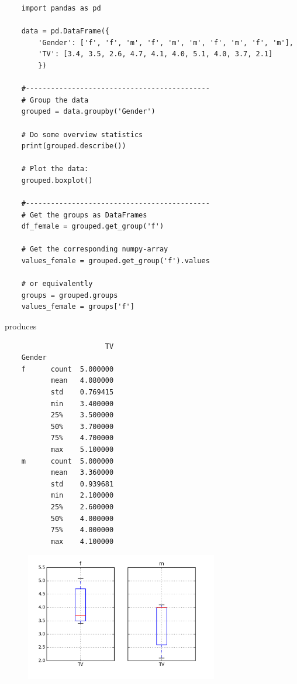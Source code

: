 \begin{lstlisting}
    import pandas as pd

    data = pd.DataFrame({
        'Gender': ['f', 'f', 'm', 'f', 'm', 'm', 'f', 'm', 'f', 'm'],
        'TV': [3.4, 3.5, 2.6, 4.7, 4.1, 4.0, 5.1, 4.0, 3.7, 2.1]
        })

    #--------------------------------------------
    # Group the data
    grouped = data.groupby('Gender')

    # Do some overview statistics
    print(grouped.describe())

    # Plot the data:
    grouped.boxplot()

    #--------------------------------------------
    # Get the groups as DataFrames
    df_female = grouped.get_group('f')

    # Get the corresponding numpy-array
    values_female = grouped.get_group('f').values

    # or equivalently
    groups = grouped.groups
    values_female = groups['f']

\end{lstlisting}

produces

\begin{lstlisting}
                        TV
    Gender
    f      count  5.000000
           mean   4.080000
           std    0.769415
           min    3.400000
           25%    3.500000
           50%    3.700000
           75%    4.700000
           max    5.100000
    m      count  5.000000
           mean   3.360000
           std    0.939681
           min    2.100000
           25%    2.600000
           50%    4.000000
           75%    4.000000
           max    4.100000
\end{lstlisting}

\begin{figure}[H]
  \centering
  \includegraphics[width=0.75\textwidth]{../Images/grouped.png}\\
\end{figure}

